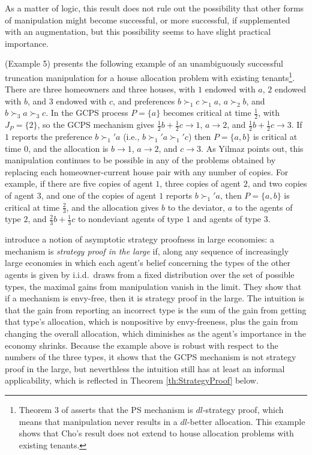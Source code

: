 \documentclass[12pt]{article}
\theoremstyle{definition}
\begin{document}
\noindent As a matter of logic, this result does not rule out the possibility that other forms of manipulation might become successful, or more successful, if supplemented with an augmentation, but this possibility seems to have slight practical importance.

\cite{yilmaz10geb} (Example 5) presents the following example of an unambiguously successful truncation manipulation for a house allocation problem with existing tenants\footnote{Theorem 3 of \citet{cho18scw} asserts that the PS mechanism is $dl$-strategy proof, which means that manipulation never results in a $dl$-better allocation.  This example shows that Cho's result does not extend to house allocation problems with existing tenants.}.  There are three homeowners and three houses, with  $1$ endowed with $a$, $2$ endowed with $b$, and $3$ endowed with $c$, and preferences $b \succ_1 c \succ_1 a$, $a \succ_2 b$, and $b \succ_3 a \succ_3 c$.  In the GCPS process $P = \{a\}$ becomes critical at time $\tfrac12$, with $J_P = \{2\}$, so the GCPS mechanism gives $\tfrac12 b + \tfrac12 c \to 1$,  $a \to 2$, and  $\tfrac12 b + \tfrac12 c \to 3$.  If $1$ reports the preference  $b \succ_1' a$  (i.e., $b \succ_1' a \succ_1' c$) then $P = \{a,b\}$ is critical at time $0$, and the allocation is $b \to 1$, $a \to 2$, and $c \to 3$.  As Yilmaz points out, this manipulation continues to be possible in any of the problems obtained by replacing each homeowner-current house pair with any number of copies.  For example, if there are five copies of agent $1$, three copies of agent $2$, and two copies of agent $3$, and one of the copies of agent $1$ reports  $b \succ_1' a$, then $P = \{a,b\}$ is critical at time $\tfrac23$, and the allocation gives $b$ to the deviator, $a$ to the agents of type $2$, and $\tfrac23 b + \tfrac13 c$ to nondeviant agents of type $1$ and agents of type $3$.

\cite{ab19res} introduce a notion of asymptotic strategy proofness in large economies: a mechanism is \emph{strategy proof in the large} if, along any sequence of increasingly large economies in which each agent's belief concerning the types of the other agents is given by i.i.d.~draws from a fixed distribution over the set of possible types, the maximal gains from manipulation vanish in the limit.  They show that if a mechanism is envy-free, then it is strategy proof in the large.  The intuition is that the gain from reporting an incorrect type is the sum of the gain from getting that type's allocation, which is nonpositive by envy-freeness, plus the gain from changing the overall allocation, which diminishes as the agent's importance in the economy shrinks. 
Because the example above is robust with respect to the numbers of the three types, it shows that the GCPS mechanism is not strategy proof in the large, but neverthless the intuition still has at least an informal applicability, which is reflected in Theorem \ref{th:StrategyProof} below.
\end{document}
